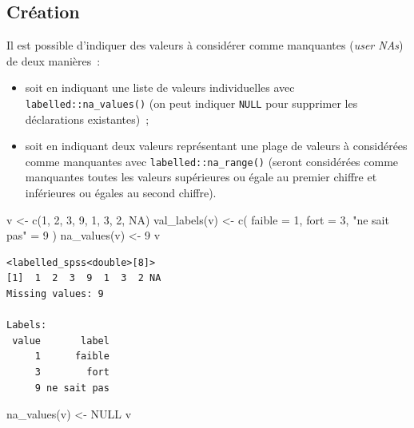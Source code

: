 \documentclass[
  letterpaper,
  DIV=11,
  numbers=noendperiod,
  oneside]{scrreprt}
\newenvironment{Shaded}{\begin{snugshade}}{\end{snugshade}}
\newcommand{\AttributeTok}[1]{\textcolor[rgb]{0.40,0.45,0.13}{#1}}
\newcommand{\ConstantTok}[1]{\textcolor[rgb]{0.56,0.35,0.01}{#1}}
\newcommand{\DecValTok}[1]{\textcolor[rgb]{0.68,0.00,0.00}{#1}}
\newcommand{\FunctionTok}[1]{\textcolor[rgb]{0.28,0.35,0.67}{#1}}
\newcommand{\NormalTok}[1]{\textcolor[rgb]{0.00,0.23,0.31}{#1}}
\newcommand{\OtherTok}[1]{\textcolor[rgb]{0.00,0.23,0.31}{#1}}
\newcommand{\StringTok}[1]{\textcolor[rgb]{0.13,0.47,0.30}{#1}}
\providecommand{\tightlist}{%
  \setlength{\itemsep}{0pt}\setlength{\parskip}{0pt}}\usepackage{longtable,booktabs,array}
\begin{document}
\hypertarget{cruxe9ation}{%
\subsection{Création}\label{cruxe9ation}}

Il est possible d'indiquer des valeurs à considérer comme manquantes
(\emph{user NAs}) de deux manières~:

\begin{itemize}
\tightlist
\item
  soit en indiquant une liste de valeurs individuelles avec
  \texttt{labelled::na\_values()} (on peut indiquer \texttt{NULL} pour
  supprimer les déclarations existantes)~;
\item
  soit en indiquant deux valeurs représentant une plage de valeurs à
  considérées comme manquantes avec \texttt{labelled::na\_range()}
  (seront considérées comme manquantes toutes les valeurs supérieures ou
  égale au premier chiffre et inférieures ou égales au second
  chiffre).
\end{itemize}

\begin{Shaded}
\begin{Highlighting}[]
\NormalTok{v }\OtherTok{\textless{}{-}} \FunctionTok{c}\NormalTok{(}\DecValTok{1}\NormalTok{, }\DecValTok{2}\NormalTok{, }\DecValTok{3}\NormalTok{, }\DecValTok{9}\NormalTok{, }\DecValTok{1}\NormalTok{, }\DecValTok{3}\NormalTok{, }\DecValTok{2}\NormalTok{, }\ConstantTok{NA}\NormalTok{)}
\FunctionTok{val\_labels}\NormalTok{(v) }\OtherTok{\textless{}{-}} \FunctionTok{c}\NormalTok{(}
  \AttributeTok{faible =} \DecValTok{1}\NormalTok{, }
  \AttributeTok{fort =} \DecValTok{3}\NormalTok{, }
  \StringTok{"ne sait pas"} \OtherTok{=} \DecValTok{9}
\NormalTok{)}
\FunctionTok{na\_values}\NormalTok{(v) }\OtherTok{\textless{}{-}} \DecValTok{9}
\NormalTok{v}
\end{Highlighting}
\end{Shaded}

\begin{verbatim}
<labelled_spss<double>[8]>
[1]  1  2  3  9  1  3  2 NA
Missing values: 9

Labels:
 value       label
     1      faible
     3        fort
     9 ne sait pas
\end{verbatim}

\begin{Shaded}
\begin{Highlighting}[]
\FunctionTok{na\_values}\NormalTok{(v) }\OtherTok{\textless{}{-}} \ConstantTok{NULL}
\NormalTok{v}
\end{Highlighting}
\end{Shaded}
\end{document}
